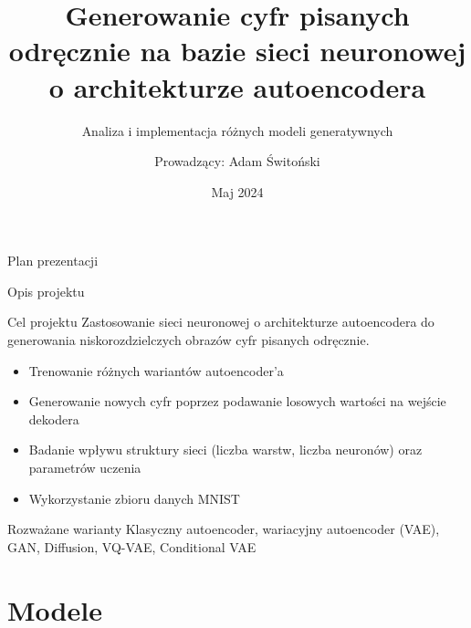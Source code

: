 \documentclass{beamer}
\title{Generowanie cyfr pisanych odręcznie na bazie sieci neuronowej o architekturze autoencodera}
\subtitle{Analiza i implementacja różnych modeli generatywnych}
\author{Prowadzący: Adam Świtoński}
\institute{Politechnika Śląska}
\date{Maj 2024}
\begin{document}
\begin{frame}
  \titlepage
\end{frame}

\begin{frame}{Plan prezentacji}
  \tableofcontents
\end{frame}

\begin{frame}{Opis projektu}
  \begin{block}{Cel projektu}
    Zastosowanie sieci neuronowej o architekturze autoencodera do generowania niskorozdzielczych obrazów cyfr pisanych odręcznie.
  \end{block}
  
  \begin{itemize}
    \item Trenowanie różnych wariantów autoencoder'a
    \item Generowanie nowych cyfr poprzez podawanie losowych wartości na wejście dekodera
    \item Badanie wpływu struktury sieci (liczba warstw, liczba neuronów) oraz parametrów uczenia
    \item Wykorzystanie zbioru danych MNIST
  \end{itemize}
  
  \begin{block}{Rozważane warianty}
    Klasyczny autoencoder, wariacyjny autoencoder (VAE), GAN, Diffusion, VQ-VAE, Conditional VAE
  \end{block}
\end{frame}


\section{Modele}
\end{document}
